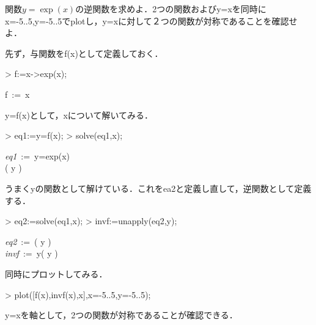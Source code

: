 \item 関数$y=\exp(x)$の逆関数を求めよ．2つの関数およびy=xを同時にx=-5..5,y=-5..5でplotし，y=xに対して２つの関数が対称であることを確認せよ．

先ず，与関数をf(x)として定義しておく．
\begin{MapleInput}
> f:=x->exp(x);
\end{MapleInput}
\begin{MapleOutput}
f\, := \,x
\end{MapleOutput}
y=f(x)として，xについて解いてみる．
\begin{MapleInput}
> eq1:=y=f(x);
> solve(eq1,x);
\end{MapleInput}
\begin{MapleOutputGather}
 {\it eq1}\, := \,y=exp(x)  \notag \\
 \ln  \left( y \right) \notag
\end{MapleOutputGather}
うまくyの関数として解けている．これをea2と定義し直して，逆関数として定義する．
\begin{MapleInput}
> eq2:=solve(eq1,x);
> invf:=unapply(eq2,y);
\end{MapleInput}
\begin{MapleOutputGather}
 {\it eq2}\, := \,\ln  \left( y \right)  \notag\\
 {\it invf}\, := \,y\mapsto \ln  \left( y \right) \notag
\end{MapleOutputGather} 
同時にプロットしてみる．
\begin{MapleInput}
> plot([f(x),invf(x),x],x=-5..5,y=-5..5);
\end{MapleInput}
y=xを軸として，2つの関数が対称であることが確認できる．

